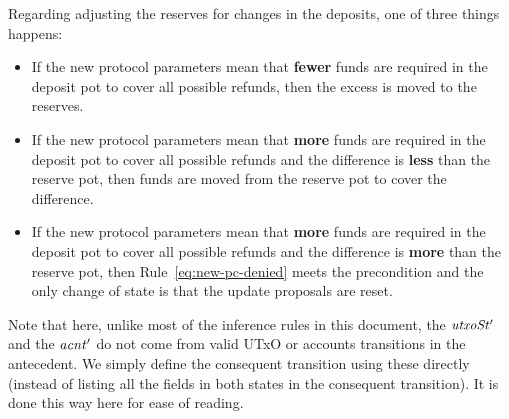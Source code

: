 Regarding adjusting the reserves for changes in the deposits, one of three things happens:

\begin{itemize}
  \item If the new protocol parameters mean that \textbf{fewer} funds are required in the
    deposit pot to cover all possible refunds, then the excess is moved to the reserves.

  \item If the new protocol parameters mean that \textbf{more} funds are required in the
    deposit pot to cover all possible refunds and the difference is \textbf{less} than
    the reserve pot, then funds are moved from the reserve pot to cover the difference.

  \item If the new protocol parameters mean that \textbf{more} funds are required in the
    deposit pot to cover all possible refunds and the difference is \textbf{more} than
    the reserve pot, then Rule~\ref{eq:new-pc-denied} meets the precondition and the
    only change of state is that the update proposals are reset.
\end{itemize}

Note that here, unlike most of the inference rules in this document,
the $\mathit{utxoSt'}$ and the $\mathit{acnt'}$ do not come from valid UTxO or
accounts transitions in the antecedent. We simply define the consequent
transition using these directly (instead of listing all the fields in both
states in the consequent transition). It is done this way here
for ease of reading.

